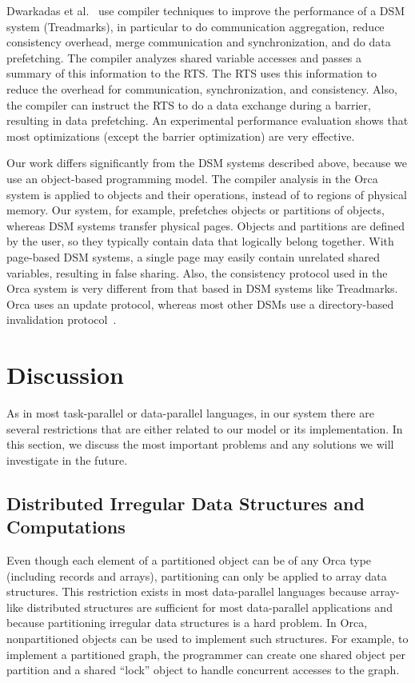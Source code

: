 \documentclass{acmtrans2e}
\begin{document}
Dwarkadas et al.~\citeyear{dwarkadas96} use
compiler techniques to improve the
performance of a DSM system (Treadmarks), in particular to do
communication aggregation, reduce consistency overhead,
merge communication and synchronization, and do data prefetching.
The compiler analyzes shared variable accesses and passes a summary
of this information to the RTS. The RTS uses this information to
reduce the overhead for communication, synchronization, and consistency.
Also, the compiler can instruct the RTS to do a data exchange during a barrier,
resulting in data prefetching. An experimental performance evaluation shows that
most optimizations (except the barrier optimization) are very effective.

Our work differs significantly from the DSM systems described above, 
because we use an object-based programming model. The compiler analysis
in the Orca system is applied to objects and their operations,
instead of to regions of physical memory. Our system, for example,
prefetches objects or partitions of objects, whereas DSM systems
transfer physical pages. Objects and partitions are defined by the user,
so they typically contain data that logically belong together.
With page-based DSM systems, a single page may easily contain unrelated
shared variables, resulting in false sharing.
Also, the consistency protocol used in the Orca system is very different
from that based in DSM systems like Treadmarks. Orca uses an update protocol,
whereas most other DSMs use a directory-based invalidation
protocol~\cite{Bal:1998}.

\section{Discussion}
\label{sec:discussion}

As in most task-parallel or data-parallel languages, in our system
there are several restrictions that are either related to our model or
its implementation. In this section, we discuss the most important
problems and any solutions we will investigate in the future.

\subsection{Distributed Irregular Data Structures and Computations}

Even though each element of a partitioned object can be of any Orca
type (including records and arrays), partitioning can only be
applied to array data structures. This restriction exists in most data-parallel
languages because array-like distributed structures are
sufficient for most data-parallel applications and because
partitioning irregular data structures is a hard problem. In Orca,
nonpartitioned objects can be used to implement such structures. For
example, to implement a partitioned graph, the programmer can create
one shared object per partition and a shared ``lock'' object to handle
concurrent accesses to the graph.
\end{document}
